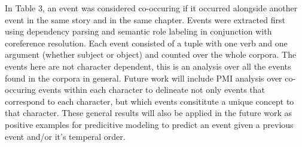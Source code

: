  In Table 3, an event was considered co-occuring if it occurred alongside another event in the same story and in the same chapter.  Events were extracted first using dependency parsing and semantic role labeling in conjunction with coreference resolution.  Each event consisted of a tuple with one verb and one argument (whether subject or object) and counted over the whole corpora.  The events here are not character dependent, this is an analysis over all the events found in the corpora in general.  Future work will include PMI analysis over co-occuring events within each character to delineate not only events that correspond to each character, but which events consititute a unique concept to that character.  These general results will also be applied in the future work as positive examples for predicitive modeling to predict an event given a previous event and/or it's temperal order.